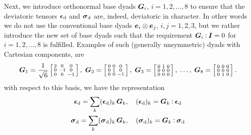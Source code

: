 \documentclass{bmcart}
\newcommand{\eqtref}[1]{\eqref{#1}}
\renewcommand{\dev}{\mathrm{d}}
\begin{document}
Next, we introduce orthonormal base dyads $\boldsymbol{G}_i$, $i = 1,2,...,8$ to ensure that the deviatoric tensors $\ts\epsilon_\dev$ and $\ts\sigma_\dev$ are, indeed, deviatoric in character.
In other words we do not use the conventional base dyads $\boldsymbol{e}_i\mathbin{\otimes}\boldsymbol{e}_j$, $i,j=1,2,3$, but we rather introduce the new set of base dyads such that the requirement $\boldsymbol{G}_i \mathbin{\vcentcolon} \boldsymbol{I} = 0$ for $i=1,2,...,8$ is fulfilled.
Examples of such (generally unsymmetric) dyads with Cartesian components, are
\begin{equation}
\begin{gathered}
 \ts G_1 = \frac{1}{\sqrt{6}}\left[\begin{smallmatrix} 2 & 0 & 0\\ 0 & -1 & 0\\ 0 & 0 & -1\end{smallmatrix}\right],\;
 \ts G_2 = \left[\begin{smallmatrix} 0 & 0 & 0\\ 0 & 1 & 0 \\ 0 & 0 & -1\end{smallmatrix}\right],\;
 \ts G_3 = \left[\begin{smallmatrix} 0 & 1 & 0\\ 0 & 0 & 0 \\ 0 & 0 & 0\end{smallmatrix}\right],\;
 \ldots,\;
 \ts G_8 = \left[\begin{smallmatrix} 0 & 0 & 0\\ 0 & 0 & 0 \\ 0 & 1 & 0\end{smallmatrix}\right].
\end{gathered}
\end{equation}
with respect to this basis, we have the representation
\begin{gather}
 \ts\epsilon_\dev = \sum_k (\ts\epsilon_\dev)_k \, \ts G_k,\quad 
 (\ts\epsilon_\dev)_k = \ts G_k \dprod \ts\epsilon_\dev
\\
 \ts\sigma_\dev = \sum_k (\ts\sigma_\dev)_k \, \ts G_k,\quad
 (\ts\sigma_\dev)_k = \ts G_k \dprod \ts\sigma_\dev
\end{gather}
\end{document}
